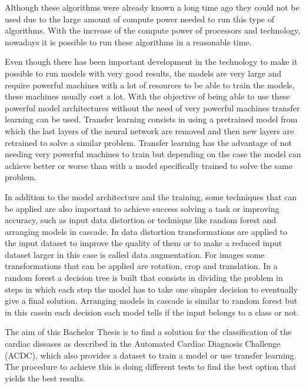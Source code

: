 \documentclass[12pt,a4paper]{article}
\begin{document}
Although these algorithms were already known a long time ago they could not be used due to the large amount of compute power needed to run this type of algorithms. With the increase of the compute power of processors and technology, nowadays it is possible to run these algorithms in a reasonable time.
\bigskip

Even though there has been important development in the technology to make it possible to run models with very good results, the models are very large and require powerful machines with a lot of resources to be able to train the models, these machines usually cost a lot. With the objective of being able to use these powerful model architectures without the need of very powerful machines transfer learning can be used. Transfer learning consists in using a pretrained model from which the last layers of the neural network are removed and then new layers are retrained to solve a similar problem. Transfer learning has the advantage of not needing very powerful machines to train but depending on the case the model can achieve better or worse than with a model specifically trained to solve the same problem.
\bigskip

In addition to the model architecture and the training, some techniques that can be applied are also important to achieve success solving a task or improving accuracy, such as input data distortion or technique like random forest and arranging models in cascade. In data distortion transformations are applied to the input dataset to improve the quality of them or to make a reduced input dataset larger in this case is called data augmentation. For images some transformations that can be applied are rotation, crop and translation. In a random forest \cite{wiki:rf} a decision tree is built that consists in dividing the problem in steps in which each step the model has to take one simpler decision to eventually give a final solution. Arranging models in cascade \cite{wiki:cc} is similar to random forest but in this casein each decision each model tells if the input belongs to a class or not.
\bigskip

The aim of this Bachelor Thesis is to find a solution for the classification of the cardiac diseases as described in the Automated Cardiac Diagnosis Challenge (ACDC), which also provides a dataset to train a model or use transfer learning. The procedure to achieve this is doing different tests to find the best option that yields the best results.
\bigskip
\end{document}
